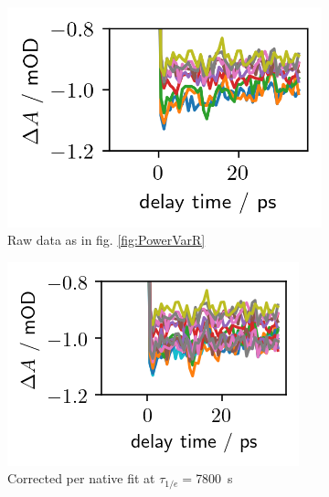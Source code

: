 \documentclass[twoside,openright]{scrreprt}
\begin{document}
\begin{figure}[hbtp]
\centering
\begin{subfigure}[t]{0.3215\linewidth}
\centering
\includegraphics[width=\columnwidth]{images/PowerVarHigh_Raw.png}
\caption{Raw data as in fig. \ref{fig:PowerVarR}}
\end{subfigure}
\hfill
\begin{subfigure}[t]{0.3215\linewidth}
\centering
\includegraphics[width=\columnwidth]{images/PowerVarHigh_CorrNative7800.png} 
\caption{Corrected per native fit at $\tau_{1/e}=$\SI{7800}{\second}}
\end{subfigure}
\hfill
\begin{subfigure}[t]{0.3215\linewidth}
\centering

\end{subfigure}
\end{figure}
\end{document}
